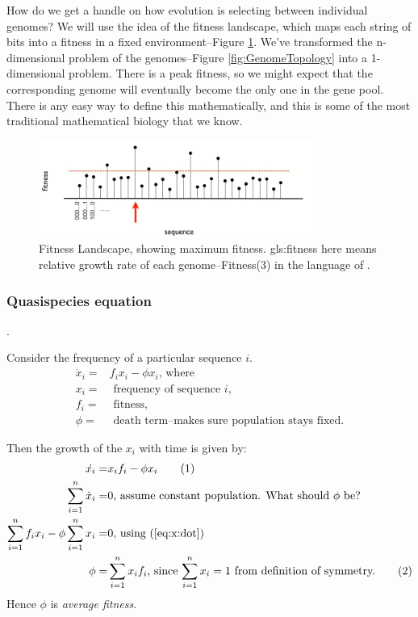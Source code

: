 \documentclass[]{article}
\newcommand\numberthis{\addtocounter{equation}{1}\tag{\theequation}}
\begin{document}
How do we get a handle on how evolution is selecting between individual genomes? We will use the idea of the fitness landscape, which maps each string of bits into a fitness in a fixed environment--Figure \ref{fig:FitnessLandscape}. We've transformed the n-dimensional problem of the genomes--Figure \ref{fig:GenomeTopology} into a 1-dimensional problem. There is a peak fitness, so we might expect that the corresponding genome will eventually become the only one in the gene pool. There is any easy way to define this mathematically, and this is some of the most traditional mathematical biology that we know.
\begin{figure}[H]
	\begin{center}
		\caption[Fitness Landscape, showing maximum fitness]{Fitness Landscape, showing maximum fitness. \Gls{gls:fitness} here means relative growth rate of each genome--Fitness(3) in the language of \cite[Chapter 10]{dawkins1982extended}. }\label{fig:FitnessLandscape} 
		\includegraphics[width=0.8\textwidth]{FitnessLandscape}
	\end{center}
\end{figure}

\subsubsection{Quasispecies equation}.

Consider the frequency of a particular sequence $i$.
\begin{align*}
	\dot x_i =& f_i x_i - \phi x_i \text{, where }\\
	x_i =& \text{ frequency of sequence $i$, }\\
	f_i =&  \text{ fitness,} \\
	\phi =& \text{ death term--makes sure population stays fixed.}
\end{align*}

Then the growth of the $x_i$ with time is given by:
\begin{align*}
	\dot{x_i} =& x_i f_i - \phi x_i \numberthis \label{eq:x:dot}\\
	\sum_{i=1}^{n} \dot x_i =& 0 \text{, assume constant population. What should $\phi$ be?}\\
	\sum_{i=1}^{n} f_i x_i - \phi \sum_{i=1}^{n} x_i =& 0 \text{, using (\ref{eq:x:dot})}\\
	\phi =& \sum_{i=1}^{n}x_i f_i\text{, since $\sum_{i=1}^{n}x_i = 1$ from definition of symmetry.} \numberthis \label{eq:qs:norm}
\end{align*}
Hence $\phi$ is \emph{average fitness}. 
\end{document}
